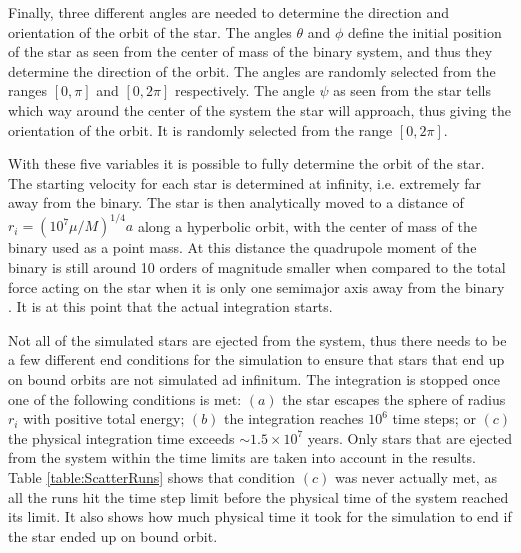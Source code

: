 \documentclass[english, oneside]{HYgradu}
\begin{document}
Finally, three different angles are needed to determine the direction and orientation of the orbit of the star. The angles $\theta$ and $\phi$ define the initial position of the star as seen from the center of mass of the binary system, and thus they determine the direction of the orbit. The angles are randomly selected from the ranges $[0,\pi]$ and $[0,2 \pi]$ respectively. The angle $\psi$ as seen from the star tells which way around the center of the system the star will approach, thus giving the orientation of the orbit. It is randomly selected from the range $[0,2 \pi]$.

With these five variables it is possible to fully determine the orbit of the star. The starting velocity for each star is determined at infinity, i.e. extremely far away from the binary. The star is then analytically moved to a distance of $r_i = (10^7 \mu/M)^{1/4} a$ along a hyperbolic orbit, with the center of mass of the binary used as a point mass. At this distance the quadrupole moment of the binary is still around 10 orders of magnitude smaller when compared to the total force acting on the star when it is only one semimajor axis away from the binary \citep{sesana:2006}. It is at this point that the actual integration starts. 

Not all of the simulated stars are ejected from the system, thus there needs to be a few different end conditions for the simulation to ensure that stars that end up on bound orbits are not simulated ad infinitum.
The integration is stopped once one of the following conditions is met: $(a)$ the star escapes the sphere of radius $r_i$ with positive total energy; $(b)$ the integration reaches $10^6$ time steps; or $(c)$ the physical integration time exceeds $\sim 1.5 \times 10^7$ years. Only stars that are ejected from the system within the time limits are taken into account in the results. Table \ref{table:ScatterRuns} shows that condition $(c)$ was never actually met, as all the runs hit the time step limit before the physical time of the system reached its limit. It also shows how much physical time it took for the simulation to end if the star ended up on bound orbit.
\end{document}
